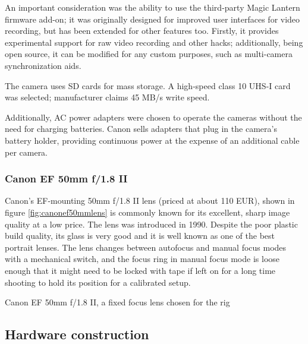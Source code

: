 An important consideration was the ability to use the third-party Magic Lantern firmware add-on;
it was originally designed for improved user interfaces for video recording, but has been extended for other features too.
Firstly, it provides experimental support for raw video recording and other hacks; additionally, being open source, it can be modified for any custom purposes, such as multi-camera synchronization aids.

The camera uses SD cards for mass storage. A high-speed class 10 UHS-I card was selected; manufacturer claims 45 MB/s write speed.

Additionally, AC power adapters were chosen to operate the cameras without the need for charging batteries.
Canon sells adapters that plug in the camera's battery holder, providing continuous power at the expense of an additional cable per camera.

\subsubsection{Canon EF 50mm f/1.8 II}

Canon's EF-mounting 50mm f/1.8 II lens (priced at about 110 EUR), shown in figure \ref{fig:canonef50mmlens} is commonly known for its excellent, sharp image quality at a low price.
The lens was introduced in 1990.
Despite the poor plastic build quality, its glass is very good and it is well known as one of the best portrait lenses.
The lens changes between autofocus and manual focus modes with a mechanical switch, and the focus ring in manual focus mode is loose enough that it might need to be locked with tape if left on for a long time shooting to hold its position for a calibrated setup.

{Canon EF 50mm f/1.8 II, a fixed focus lens chosen for the rig}


\subsection{Hardware construction} %

